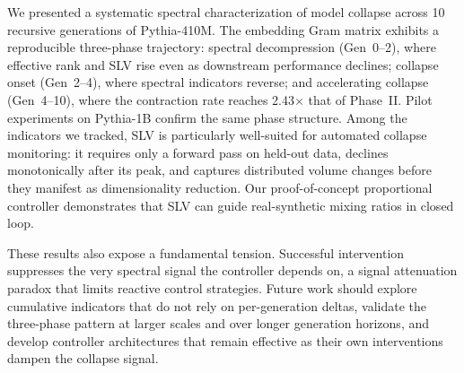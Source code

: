 
We presented a systematic spectral characterization of model collapse across 10 recursive generations of Pythia-410M.
The embedding Gram matrix exhibits a reproducible three-phase trajectory: spectral decompression (Gen~0--2), where effective rank and SLV rise even as downstream performance declines; collapse onset (Gen~2--4), where spectral indicators reverse; and accelerating collapse (Gen~4--10), where the contraction rate reaches 2.43$\times$ that of Phase~II.
Pilot experiments on Pythia-1B confirm the same phase structure.
Among the indicators we tracked, SLV is particularly well-suited for automated collapse monitoring: it requires only a forward pass on held-out data, declines monotonically after its peak, and captures distributed volume changes before they manifest as dimensionality reduction.
Our proof-of-concept proportional controller demonstrates that SLV can guide real-synthetic mixing ratios in closed loop.

These results also expose a fundamental tension.
Successful intervention suppresses the very spectral signal the controller depends on, a signal attenuation paradox that limits reactive control strategies.
Future work should explore cumulative indicators that do not rely on per-generation deltas, validate the three-phase pattern at larger scales and over longer generation horizons, and develop controller architectures that remain effective as their own interventions dampen the collapse signal.
